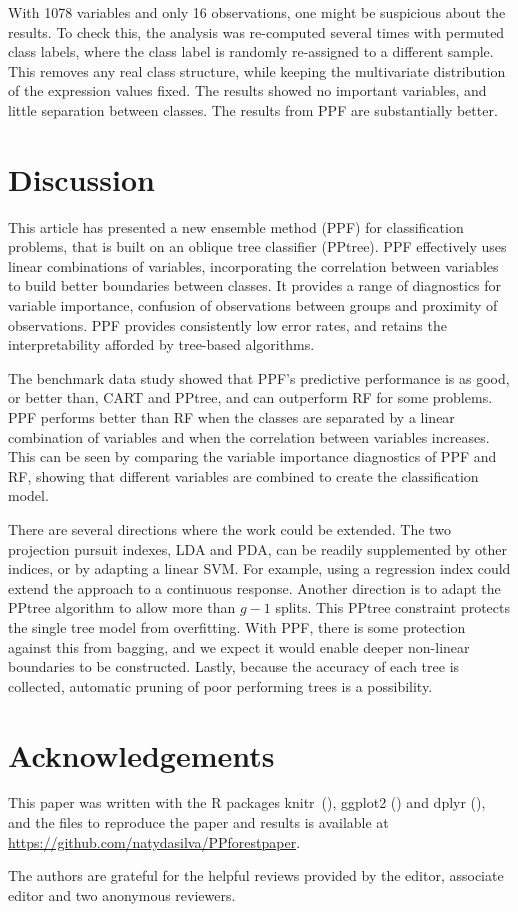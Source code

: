 \documentclass[12pt]{article}\usepackage[]{graphicx}\usepackage[]{color}
\begin{document}
With 1078 variables and only 16 observations, one might be suspicious about the results. To check this, the analysis was re-computed several times with permuted class labels, where the class label is randomly re-assigned to a different sample. This removes any real class structure, while keeping the multivariate distribution of the expression values fixed. The results showed no important variables, and little separation between classes. The results from PPF are substantially better.

\section{Discussion}\label{discpp1}

This article has presented a new ensemble method (PPF) for classification problems, that is built on an oblique tree classifier (PPtree). PPF effectively uses linear combinations of variables, incorporating the correlation between variables to build better boundaries between classes. It provides a range of diagnostics for variable importance, confusion of observations between groups and proximity of observations. PPF provides consistently low error rates, and retains the interpretability afforded by tree-based algorithms.

The benchmark data study showed that PPF's predictive performance is as good, or better than, CART and PPtree, and can outperform RF for some problems. PPF performs better than RF when the classes are separated by a linear combination of variables and when the correlation between variables increases. This can be seen by comparing the variable importance diagnostics of PPF and RF, showing that different variables are combined to create the classification model.

There are several directions where the work could be extended. The two projection pursuit indexes, LDA and PDA, can be readily supplemented by other indices, or by adapting a linear SVM. For example, using a regression index could extend the approach to a continuous response. Another direction is to adapt the PPtree algorithm to allow more than $g-1$ splits. This PPtree constraint protects the single tree model from overfitting. With PPF, there is some protection against this from bagging, and we expect it would enable deeper non-linear boundaries to be constructed. Lastly, because the accuracy of each tree is collected, automatic pruning of poor performing trees is a possibility.


\section{Acknowledgements}
\label{Aknow}

This paper was written with the R packages knitr~(\cite{xie:2015}), ggplot2 (\cite{hadley:2009}) and dplyr (\cite{dplyr}), and the files to reproduce the paper and results is available at \url{https://github.com/natydasilva/PPforestpaper}.

The authors are grateful for the helpful reviews provided by the editor, associate editor and two anonymous reviewers. 




\end{document}
